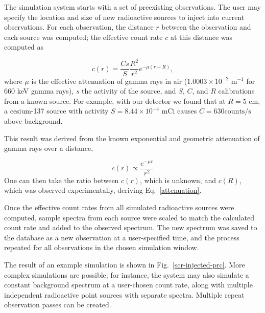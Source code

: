 The simulation system starts with a set of preexisting observations. The user
may specify the location and size of new radioactive sources to inject into
current observations. For each observation, the distance \(r\) between the
observation and each source was computed; the effective count rate \(c\) at this
distance was computed as

\begin{equation}\label{attenuation}
c(r) = \frac{Cs}{S}  \frac{R^2}{r^2} e^{-\mu (r+R)},
\end{equation}
where \(\mu\) is the effective attenuation of gamma rays in air (\(1.0003 \times
10^{-2} \text{ m}^{-1}\) for 660 keV gamma rays), \(s\) the activity of the
source, and \(S\), \(C\), and \(R\) calibrations from a known source. For
example, with our detector we found that at \(R=5\text{ cm}\), a cesium-137
source with activity \(S=8.44 \times 10^{-4} \text{ mCi}\) causes \(C=630 \text{
  counts/s}\) above background.

This result was derived from the known exponential and geometric attenuation of
gamma rays over a distance,

\begin{equation}
c(r) \propto \frac{e^{-\mu r}}{r^2}
\end{equation}
One can then take the ratio between \(c(r)\), which is unknown, and \(c(R)\),
which was observed experimentally, deriving Eq.~\ref{attenuation}.

Once the effective count rates from all simulated radioactive sources were
computed, sample spectra from each source were scaled to match the calculated
count rate and added to the observed spectrum. The new spectrum was saved to the
database as a new observation at a user-specified time, and the process repeated
for all observations in the chosen simulation window.

The result of an example simulation is shown in
Fig.~\ref{scr-injected-prc}. More complex simulations are possible; for
instance, the system may also simulate a constant background spectrum at a
user-chosen count rate, along with multiple independent radioactive point
sources with separate spectra. Multiple repeat observation passes can be
created.

